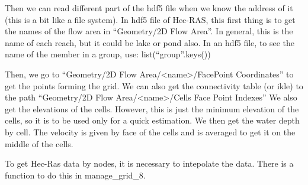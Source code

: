 \documentclass[letterpaper,10pt,english]{sphinxmanual}
\begin{document}
\begin{fulllineitems}
Then we can read different part of the hdf5 file when we know the address of it (this is a bit like a file system).
In hdf5 file of Hec-RAS, this first thing is to get the names of the flow area in “Geometry/2D Flow Area”. In
general, this is the name of each reach, but it could be lake or pond also. In an hdf5 file, to see the name of
the member in a group, use: list(``group''.keys())

Then, we go to “Geometry/2D Flow Area/\textless{}name\textgreater{}/FacePoint Coordinates” to get the points forming the grid.
We can also get the connectivity table (or ikle) to the path “Geometry/2D Flow Area/\textless{}name\textgreater{}/Cells Face Point Indexes”
We also get the elevations of the cells. However, this is just the minimum elevation of the cells, so it is
to be used only for a quick estimation. We then get the water depth by cell.
The velocity is given by face of the cells and is averaged to get it on the middle of the cells.

To get Hec-Ras data by nodes, it is necessary to intepolate the data. There is a function to do this in
manage\_grid\_8.

\end{fulllineitems}

\end{document}
